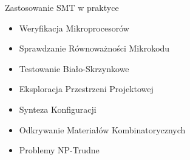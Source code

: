 \begin{frame}{Zastosowanie SMT w praktyce}
	\begin{itemize}
		\item Weryfikacja Mikroprocesorów
		\item Sprawdzanie Równoważności Mikrokodu
		\item Testowanie Biało-Skrzynkowe
		\item Eksploracja Przestrzeni Projektowej
		\item Synteza Konfiguracji
		\item Odkrywanie Materiałów Kombinatorycznych
		\item Problemy NP-Trudne
	\end{itemize}
\end{frame}